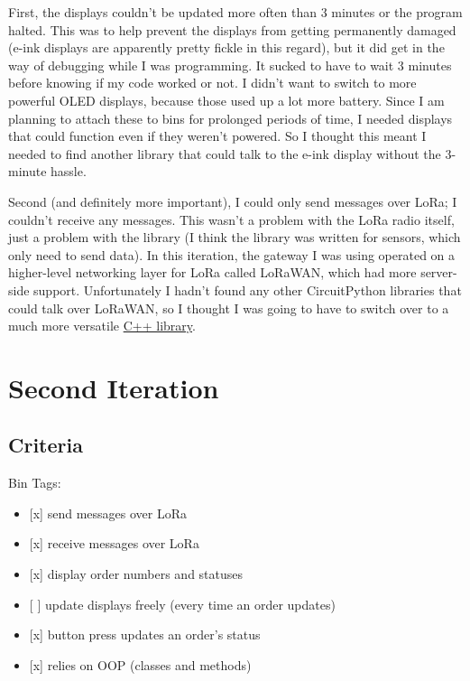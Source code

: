 \documentclass{article}
\begin{document}
First, the displays couldn't be updated more often than 3 minutes or the
program halted. This was to help prevent the displays from getting
permanently damaged (e-ink displays are apparently pretty fickle in this
regard), but it did get in the way of debugging while I was programming.
It sucked to have to wait 3 minutes before knowing if my code worked or
not. I didn't want to switch to more powerful OLED displays, because
those used up a lot more battery. Since I am planning to attach these to
bins for prolonged periods of time, I needed displays that could
function even if they weren't powered. So I thought this meant I needed
to find another library that could talk to the e-ink display without the
3-minute hassle.

Second (and definitely more important), I could only send messages over
LoRa; I couldn't receive any messages. This wasn't a problem with the
LoRa radio itself, just a problem with the library (I think the library
was written for sensors, which only need to send data). In this
iteration, the gateway I was using operated on a higher-level networking
layer for LoRa called LoRaWAN, which had more server-side support.
Unfortunately I hadn't found any other CircuitPython libraries that
could talk over LoRaWAN, so I thought I was going to have to switch over
to a much more versatile
\href{https://github.com/mcci-catena/arduino-lorawan}{C++ library}.

\section{Second Iteration}\label{second-iteration}

\subsection{Criteria}\label{criteria-2}

\noindent
Bin Tags:

\begin{itemize}
\item
  {[}x{]} send messages over LoRa
\item
  {[}x{]} receive messages over LoRa
\item
  {[}x{]} display order numbers and statuses
\item
  {[} {]} update displays freely (every time an order updates)
\item
  {[}x{]} button press updates an order's status
\item
  {[}x{]} relies on OOP (classes and methods)
\end{itemize}
\end{document}
